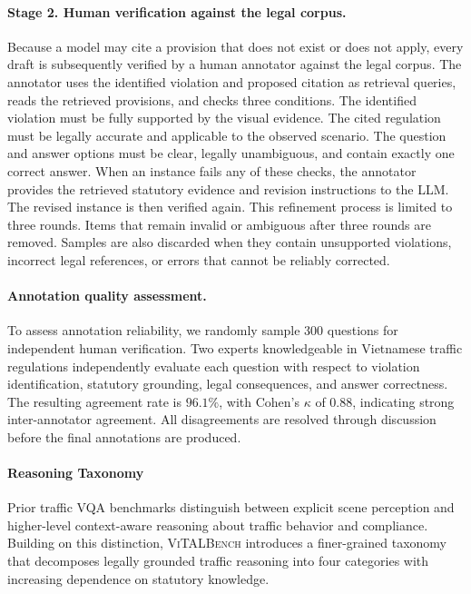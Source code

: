 \paragraph{Stage 2. Human verification against the legal corpus.}
Because a model may cite a provision that does not exist or does not apply, every draft is subsequently verified by a human annotator against the legal corpus. The annotator uses the identified violation and proposed citation as retrieval queries, reads the retrieved provisions, and checks three conditions. The identified violation must be fully supported by the visual evidence. The cited regulation must be legally accurate and applicable to the observed scenario. The question and answer options must be clear, legally unambiguous, and contain exactly one correct answer. When an instance fails any of these checks, the annotator provides the retrieved statutory evidence and revision instructions to the LLM. The revised instance is then verified again. This refinement process is limited to three rounds. Items that remain invalid or ambiguous after three rounds are removed. Samples are also discarded when they contain unsupported violations, incorrect legal references, or errors that cannot be reliably corrected.
\paragraph{Annotation quality assessment.}
To assess annotation reliability, we randomly sample 300 questions for independent human verification. Two experts knowledgeable in Vietnamese traffic regulations independently evaluate each question with respect to violation identification, statutory grounding, legal consequences, and answer correctness. The resulting agreement rate is $96.1\%$, with Cohen's $\kappa$ of $0.88$, indicating strong inter-annotator agreement. All disagreements are resolved through discussion before the final annotations are produced.

\paragraph{Reasoning Taxonomy}


Prior traffic VQA benchmarks distinguish between explicit scene perception and higher-level context-aware reasoning about traffic behavior and compliance. Building on this distinction, \textsc{ViTALBench} introduces a finer-grained taxonomy that decomposes legally grounded traffic reasoning into four categories with increasing dependence on statutory knowledge.


